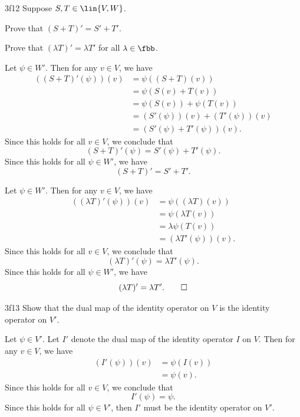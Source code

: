 \begin{exercise}{3f12}
    Suppose $S, T \in \lin{V, W}$.
    \begin{subexercises}
        \item Prove that $(S + T)' = S' + T'$.
        \item Prove that $(\lambda T)' = \lambda T'$ for all $\lambda \in \fbb$.
    \end{subexercises}
\end{exercise}

\begin{solenum}
    \item Let $\psi \in W'$.
	Then for any $v \in V$, we have
    \begin{align*}
        ((S + T)'(\psi))(v) &= \psi((S + T)(v)) \\
        &= \psi(S(v) + T(v)) \\
        &= \psi(S(v)) + \psi(T(v)) \\
        &= (S'(\psi))(v) + (T'(\psi))(v) \\
        &= (S'(\psi) + T'(\psi))(v).
    \end{align*}
    Since this holds for all $v \in V$, we conclude that
    \[
    	(S + T)'(\psi) = S'(\psi) + T'(\psi).
    \]
    Since this holds for all $\psi \in W'$, we have
    \[
    	(S + T)' = S' + T'.
    \]
    \item Let $\psi \in W'$.
	Then for any $v \in V$, we have
    \begin{align*}
        ((\lambda T)'(\psi))(v) &= \psi((\lambda T)(v)) \\
        &= \psi(\lambda T(v)) \\
        &= \lambda \psi(T(v)) \\
        &= (\lambda T'(\psi))(v).
    \end{align*}
    Since this holds for all $v \in V$, we conclude that
    \[
    	(\lambda T)'(\psi) = \lambda T'(\psi).
    \]
    Since this holds for all $\psi \in W'$, we have
    \[
    	(\lambda T)' = \lambda T'. \qedhere
    \]
\end{solenum}

\begin{exercise}{3f13}
    Show that the dual map of the identity operator on $V$ is the identity operator on $V'$.
\end{exercise}

\begin{sol}
    Let $\psi \in V'$.
	Let $I'$ denote the dual map of the identity operator $I$ on $V$.
	Then for any $v \in V$, we have
    \begin{align*}
        (I'(\psi))(v) &= \psi(I(v)) \\
        &= \psi(v).
    \end{align*}
    Since this holds for all $v \in V$, we conclude that
    \[
    	I'(\psi) = \psi.
    \]
    Since this holds for all $\psi \in V'$, then $I'$ must be the identity operator on $V'$.
\end{sol}

